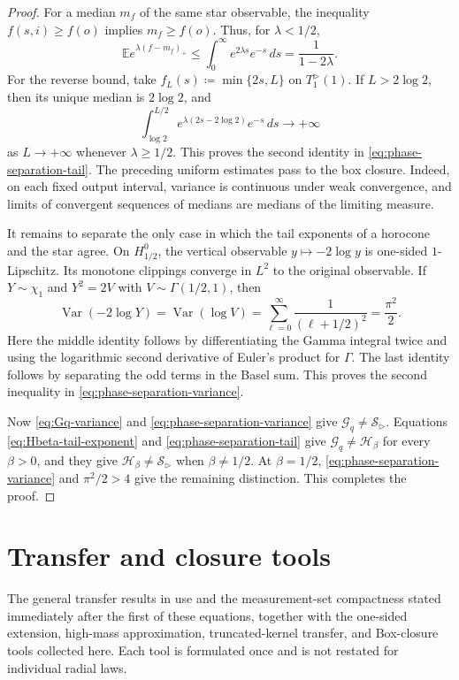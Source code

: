 \documentclass{amsart}
\numberwithin{equation}{section}
\theoremstyle{plain}
\theoremstyle{definition}
\theoremstyle{remark}
\newcommand{\Var}{\operatorname{Var}}
\begin{document}
\begin{proof}
For a median $m_f$ of the same star observable, the inequality
$f(s,i)\ge f(o)$ implies $m_f\ge f(o)$.  Thus, for $\lambda<1/2$,
\[ \mathbb E e^{\lambda(f-m_f)_+} \le\int_0^\infty e^{2\lambda s}e^{-s}\,ds =\frac1{1-2\lambda}. \]
For the reverse bound, take $f_L(s)\coloneqq\min\{2s,L\}$ on
$T_1^{\rhd}(1)$.  If $L>2\log2$, then its unique median is $2\log2$, and
\[ \int_{\log2}^{L/2} e^{\lambda(2s-2\log2)}e^{-s}\,ds \longrightarrow+\infty \]
as $L\to+\infty$ whenever $\lambda\ge1/2$.  This proves the second identity
in \eqref{eq:phase-separation-tail}.  The preceding uniform estimates pass
to the box closure.  Indeed, on each fixed output interval, variance is
continuous under weak convergence, and limits of convergent sequences of
medians are medians of the limiting measure.

It remains to separate the only case in which the tail exponents of a
horocone and the star agree.  On $H_{1/2}^0$, the vertical observable
$y\mapsto-2\log y$ is one-sided $1$-Lipschitz.  Its monotone clippings
converge in $L^2$ to the original observable.  If $Y\sim\chi_1$ and
$Y^2=2V$ with $V\sim\Gamma(1/2,1)$, then
\[ \Var(-2\log Y)=\Var(\log V) =\sum_{\ell=0}^\infty\frac1{(\ell+1/2)^2} =\frac{\pi^2}{2}. \]
Here the middle identity follows by differentiating the Gamma integral
twice and using the logarithmic second derivative of Euler's product for
$\Gamma$.  The last identity follows by separating the odd terms in the
Basel sum.
This proves the second inequality in \eqref{eq:phase-separation-variance}.

Now \eqref{eq:Gq-variance} and \eqref{eq:phase-separation-variance} give
$\mathcal G_q\ne\mathcal S_{\rhd}$.  Equations
\eqref{eq:Hbeta-tail-exponent} and \eqref{eq:phase-separation-tail} give
$\mathcal G_q\ne\mathcal H_\beta$ for every $\beta>0$, and they give
$\mathcal H_\beta\ne\mathcal S_{\rhd}$ when $\beta\ne1/2$.  At
$\beta=1/2$, \eqref{eq:phase-separation-variance} and $\pi^2/2>4$ give the
remaining distinction.  This completes the proof.
\end{proof}

\appendix

\section{Transfer and closure tools}\label{app:transfer-tools}

The general transfer results in  use
 and the
measurement-set compactness stated immediately after the first of these equations, together with the one-sided extension,
high-mass approximation, truncated-kernel transfer, and Box-closure tools collected here.  Each tool is formulated once and
is not restated for individual radial laws.
\end{document}
